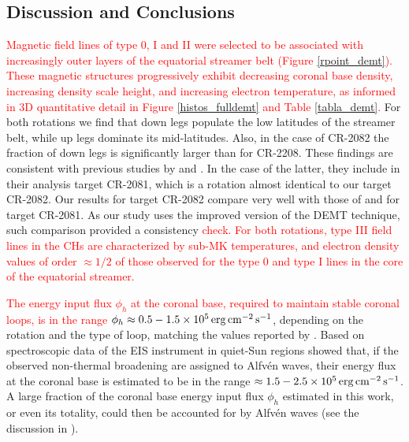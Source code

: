 \documentclass[namedreferences]{solarphysics}
\def\edit#1{\textcolor{Red}{#1}}
\newcommand{\cm}{{\rm cm}}
\newcommand{\cminvs}{\cm^{-2}}
\newcommand{\erg}{{\rm erg}}
\newcommand{\s}{{\rm s}}
\begin{document}
\begin{article}
\section{{Discussion and Conclusions}}\label{discu} 

\edit{Magnetic field lines of type 0, I and II were selected to be associated with increasingly outer layers of the equatorial streamer belt (Figure \ref{rpoint_demt}). These magnetic structures progressively exhibit decreasing coronal base density, increasing density scale height, and increasing electron temperature, as informed in 3D quantitative detail in Figure \ref{histos_fulldemt} and Table \ref{tabla_demt}.} For both rotations we find that down legs populate the low latitudes of the streamer belt, while up legs dominate its mid-latitudes. Also, in the case of CR-2082 the fraction of down legs is significantly larger than for CR-2208. These findings are consistent with previous studies by \citet{huang_2012} and \citet{nuevo_2013}. In the case of the latter, they include in their analysis target CR-2081, which is a rotation almost identical to our target CR-2082. Our results for target CR-2082 compare very well with those of \citet{nuevo_2015} and \citet{lloveras_2017} for target CR-2081. As our study uses the improved version of the DEMT technique, such comparison provided a consistency \edit{check.} \edit{For both rotations, type III field lines in the CHs are characterized by sub-MK temperatures, and electron density values of order $\approx 1/2$ of those observed for the type 0 and type I lines in the core of the equatorial streamer.}

\edit{The energy input flux $\phi_h$ at the coronal base, required to maintain stable coronal loops, is in the range} $\phi_h\approx 0.5-1.5 \times 10^5\,\erg\,\cminvs\,\s^{-1}$, depending on the rotation and the type of {loop, matching the values reported by} \citet{maccormack_2017}. Based on spectroscopic data of the EIS instrument in quiet-Sun regions \citet{hahn_2014} showed that, if the observed non-thermal broadening are assigned to Alfvén waves, their energy flux at the coronal base is estimated to be in the range $\approx 1.5-2.5\times 10^5\,\erg\,\cminvs\,\s^{-1}$. A large fraction of the coronal base energy input flux $\phi_h$ estimated in this work, or even its totality, could then be accounted for by Alfvén waves (see the discussion in \citealt{maccormack_2017}).


\end{article}
\end{document}

